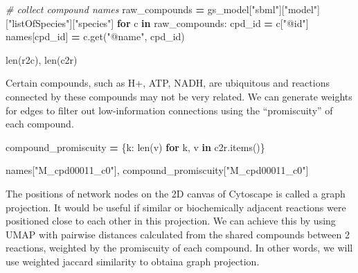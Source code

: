 \documentclass[
]{book}
\newenvironment{Shaded}{\begin{snugshade}}{\end{snugshade}}
\newcommand{\BuiltInTok}[1]{#1}
\newcommand{\CommentTok}[1]{\textcolor[rgb]{0.56,0.35,0.01}{\textit{#1}}}
\newcommand{\ControlFlowTok}[1]{\textcolor[rgb]{0.13,0.29,0.53}{\textbf{#1}}}
\newcommand{\KeywordTok}[1]{\textcolor[rgb]{0.13,0.29,0.53}{\textbf{#1}}}
\newcommand{\NormalTok}[1]{#1}
\newcommand{\OperatorTok}[1]{\textcolor[rgb]{0.81,0.36,0.00}{\textbf{#1}}}
\newcommand{\StringTok}[1]{\textcolor[rgb]{0.31,0.60,0.02}{#1}}
\begin{document}
\begin{Shaded}
\begin{Highlighting}[numbers=left,,]
\CommentTok{\# collect compound names}
\NormalTok{raw\_compounds }\OperatorTok{=}\NormalTok{ gs\_model[}\StringTok{"sbml"}\NormalTok{][}\StringTok{"model"}\NormalTok{][}\StringTok{"listOfSpecies"}\NormalTok{][}\StringTok{"species"}\NormalTok{]}
\ControlFlowTok{for}\NormalTok{ c }\KeywordTok{in}\NormalTok{ raw\_compounds:}
\NormalTok{    cpd\_id }\OperatorTok{=}\NormalTok{ c[}\StringTok{"@id"}\NormalTok{]}
\NormalTok{    names[cpd\_id] }\OperatorTok{=}\NormalTok{ c.get(}\StringTok{"@name"}\NormalTok{, cpd\_id)}

\BuiltInTok{len}\NormalTok{(r2c), }\BuiltInTok{len}\NormalTok{(c2r)}
\end{Highlighting}
\end{Shaded}

Certain compounds, such as H+, ATP, NADH, are ubiquitous and reactions connected by these compounds may not be very related.
We can generate weights for edges to filter out low-information connections using the ``promiscuity'' of each compound.

\begin{Shaded}
\begin{Highlighting}[numbers=left,,]
\NormalTok{compound\_promiscuity }\OperatorTok{=}\NormalTok{ \{k: }\BuiltInTok{len}\NormalTok{(v) }\ControlFlowTok{for}\NormalTok{ k, v }\KeywordTok{in}\NormalTok{ c2r.items()\}}

\NormalTok{names[}\StringTok{"M\_cpd00011\_c0"}\NormalTok{], compound\_promiscuity[}\StringTok{"M\_cpd00011\_c0"}\NormalTok{]}
\end{Highlighting}
\end{Shaded}

The positions of network nodes on the 2D canvas of Cytoscape is called a graph projection.
It would be useful if similar or biochemically adjacent reactions were positioned close to each other in this projection.
We can achieve this by using UMAP with pairwise distances calculated from the shared compounds between 2 reactions, weighted by
the promiscuity of each compound. In other words, we will use weighted jaccard similarity to obtaina graph projection.
\end{document}
